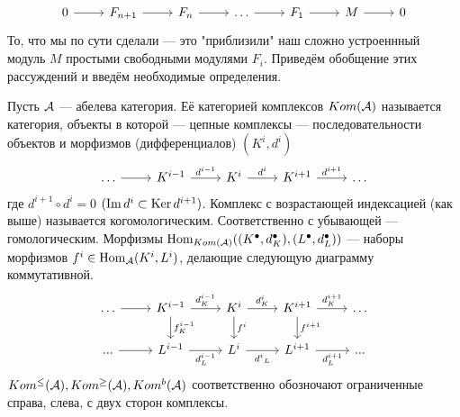 \documentclass[../main.tex]{subfiles}
\begin{document}
\begin{equation}\label{free_res_hilb}
    \begin{tikzcd}
	0 & {F_{n+1}} & {F_n} & \ldots & {F_1} & M & 0
	\arrow[from=1-1, to=1-2]
	\arrow[from=1-2, to=1-3]
	\arrow[from=1-3, to=1-4]
	\arrow[from=1-4, to=1-5]
	\arrow[from=1-5, to=1-6]
	\arrow[from=1-6, to=1-7]
\end{tikzcd}
\end{equation}
То, что мы по сути сделали --- это "приблизили" наш сложно устроеннный модуль $M$ простыми свободными модулями $F_i$.
Приведём обобщение этих рассуждений и введём необходимые определения.
\begin{to_def}\label{complex}
Пусть $\mathcal{A}$ --- абелева категория. Её категорией комплексов $Kom(\mathcal{A})$ называется категория, объекты в которой --- цепные комплексы --- последовательности объектов и морфизмов (дифференциалов) $(K^i, d^i)$
\begin{equation*}
    \begin{tikzcd}
	\ldots & {K^{i-1}} & {K^i} & {K^{i+1}} & \ldots
	\arrow[from=1-1, to=1-2]
	\arrow["{d^{i-1}}", from=1-2, to=1-3]
	\arrow["{d^i}", from=1-3, to=1-4]
	\arrow["{d^{i+1}}", from=1-4, to=1-5]
\end{tikzcd}
\end{equation*}
где $d^{i+1}\circ d^{i} = 0$ $(\mathop{\mathrm{Im}}\nolimits d^i \subset \mathop{\mathrm{Ker}}\nolimits d^{i+1})$. Комплекс с возрастающей индексацией (как выше) называется когомологическим. Соответственно с убывающей --- гомологическим. Морфизмы $\operatorname{Hom}_{Kom(\mathcal{A})}((K^\bullet, d^\bullet_K), (L^\bullet, d^\bullet_L))$ --- наборы морфизмов $f^i \in \operatorname{Hom}_{\mathcal{A}}(K^i, L^i)$, делающие следующую диаграмму коммутативной.
\begin{equation}\label{komplex_morphisms}
\begin{tikzcd}
	\ldots & {K^{i-1}} & {K^i} & {K^{i+1}} & \ldots \\
	{...} & {L^{i-1}} & {L^i} & {L^{i+1}} & {...}
	\arrow[from=1-1, to=1-2]
	\arrow["{d^{i-1}_K}", from=1-2, to=1-3]
	\arrow["{d^i_K}", from=1-3, to=1-4]
	\arrow["{d^{i+1}_K}", from=1-4, to=1-5]
	\arrow["{f^{i-1}_K}", from=1-2, to=2-2]
	\arrow[from=2-1, to=2-2]
	\arrow["{d^{i-1}_L}"', from=2-2, to=2-3]
	\arrow["{d^i}_L"', from=2-3, to=2-4]
	\arrow["{d^{i+1}_L}"', from=2-4, to=2-5]
	\arrow["{f^{i}}", from=1-3, to=2-3]
	\arrow["{f^{i+1}}", from=1-4, to=2-4]
\end{tikzcd}
\end{equation}
$Kom^\le(\mathcal{A}), Kom^\ge(\mathcal{A}), Kom^b(\mathcal{A})$ соответственно обозночают ограниченные справа, слева, с двух сторон комплексы.
\end{to_def}
\end{document}

